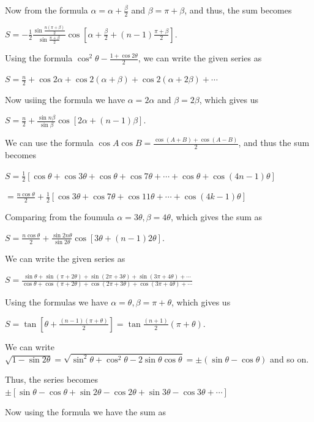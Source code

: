   Now from  the formula $\alpha = \alpha + \frac{\beta}{2}$ and $\beta = \pi + \beta$, and thus, the sum
  becomes

  $S = -\frac{1}{2}\frac{\sin \frac{n(\pi + \beta)}{2}}{\sin\frac{\pi + \beta}{2}}\cos\left[\alpha +
    \frac{\beta}{2} + (n - 1)\frac{\pi + \beta}{2}\right]$.
\item Using the formula $\cos^2\theta - \frac{1 + \cos2\theta}{2}$, we can write the given series as

  $S = \frac{n}{2} + \cos2\alpha + \cos2(\alpha + \beta) + \cos2(\alpha + 2\beta) + \cdots$

  Now usiing the formula we have $\alpha = 2\alpha$ and $\beta = 2\beta$, which gives us

  $S = \frac{n}{2} + \frac{\sin n\beta}{\sin\beta}\cos[2\alpha + (n - 1)\beta]$.
\item We can use the formula $\cos A\cos B = \frac{\cos(A + B) + \cos(A - B)}{2}$, and thus the sum becomes

  $S = \frac{1}{2}\left[\cos\theta + \cos3\theta + \cos\theta + \cos7\theta + \cdots + \cos\theta + \cos(4n
  - 1)\theta\right]$

  $= \frac{n\cos\theta}{2} + \frac{1}{2}[\cos3\theta  + \cos7\theta + \cos11\theta + \cdots + \cos(4k -
  1)\theta]$

  Comparing from the foumula $\alpha = 3\theta, \beta = 4\theta$, which gives the sum as

  $S = \frac{n\cos\theta}{2} + \frac{\sin2n\theta}{\sin2\theta}\cos[3\theta + (n - 1)2\theta]$.
\item We can write the given series as

  $S = \frac{\sin\theta + \sin(\pi + 2\theta) + \sin(2\pi + 3\theta) + \sin(3\pi + 4\theta) +
  \cdots}{\cos\theta + \cos(\pi + 2\theta) + \cos(2\pi + 3\theta) + \cos(3\pi + 4\theta) + \cdots}$

  Using the formulas we have $\alpha = \theta, \beta = \pi + \theta$, which gives us

  $S = \tan\left[\theta + \frac{(n - 1)(\pi + \theta)}{2}\right] = \tan\frac{(n + 1)}{2}(\pi + \theta)$.
\item We can write $\sqrt{1 - \sin2\theta} = \sqrt{\sin^2\theta + \cos^2\theta - 2\sin\theta\cos\theta} =
  \pm(\sin\theta -\cos\theta)$ and so on.

  Thus, the series becomes $\pm[\sin\theta - \cos\theta + \sin2\theta - \cos2\theta + \sin3\theta -
    \cos3\theta + \cdots]$

  Now using the formula we have the sum as

